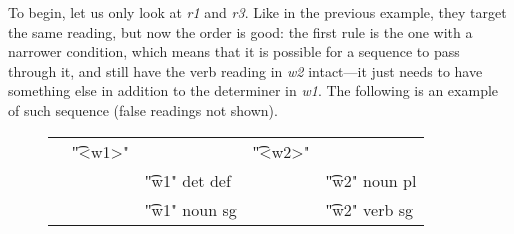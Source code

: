 To begin, let us only look at {\em r1} and {\em r3}. Like in the previous example, they target the same reading, but now the order is good: the first rule is the one with a narrower condition, which means that it is possible for a sequence to pass through it, and still have the verb reading in {\em w2} intact---it just needs to have something else in addition to the determiner in {\em w1}.
The following is an example of such sequence (false readings not shown). %

\begin{figure}[h]
\begin{tabular}{p{0.2cm} p{0.6cm} l  p{0.6cm} l }
& \t{"<w1>"}    &                     &  \t{"<w2>"}  &           \\
&              & \t{"w1" det def}    & &      \t{"w2" noun pl}  \\
&              & \t{"w1" noun sg}    & &      \t{"w2" verb sg}  \\
\end{tabular}
\end{figure}


